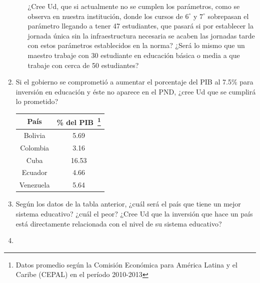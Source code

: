 \documentclass[10pt,twoside]{article}
\begin{document}
\begin{enumerate}
\begin{enumerate}
¿Cree Ud, que si actualmente no se cumplen los parámetros, como se observa en nuestra institución, donde los cursos de $6^{\circ}$ y $7^{\circ}$ sobrepasan el parámetro llegando a tener 47 estudiantes, que pasará si por establecer la jornada única sin la infraestructura necesaria se acaben las jornadas tarde con estos parámetros establecidos en la norma? ¿Será lo mismo que un maestro trabaje con 30 estudiante en educación básica o media a que trabaje con cerca de 50 estudiantes?
\end{enumerate}
\item Si el gobierno se comprometió a aumentar el porcentaje del PIB al 7.5\% para inversión en educación y éste no aparece en el PND, ¿cree Ud que se cumplirá lo prometido?
\begin{center}
\begin{tabular}{|c|c|}
\hline 
País & \% del PIB~\footnote{Datos promedio según la Comisión Económica para América Latina y el Caribe (CEPAL) en el período 2010-2013} \\ 
\hline 
Bolivia & 5.69 \\ 
\hline 
Colombia & 3.16 \\ 
\hline 
Cuba & 16.53 \\ 
\hline 
Ecuador & 4.66 \\ 
\hline 
Venezuela & 5.64 \\ 
\hline 
\end{tabular}
\end{center}
\item Según los datos de la tabla anterior, ¿cuál será el país que tiene un mejor sistema educativo? ¿cuál el peor? ¿Cree Ud que la inversión que hace un país está directamente relacionada con el nivel de su sistema educativo?
\item 
\end{enumerate}
\end{document}
